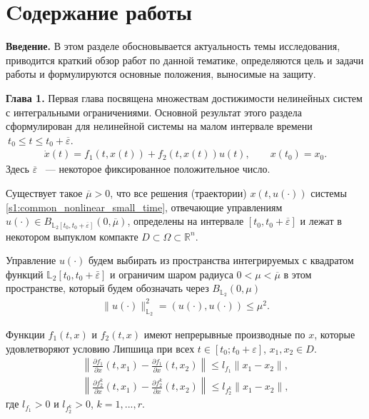 \documentclass[../abstract.tex]{subfiles}
\begin{document}
\section*{Cодержание работы}
\textbf{Введение.} 
В этом разделе обосновывается актуальность темы исследования, приводится краткий обзор работ по данной тематике, определяются цель и задачи работы и формулируются основные положения, выносимые на защиту.


\textbf{Глава 1.}
Первая глава посвящена множествам достижимости нелинейных систем с интегральными ограничениями. 
Основной результат этого раздела сформулирован для нелинейной системы на малом интервале времени $\ t_0 \leqslant t \leqslant t_0 + \overline{\varepsilon} $.
\begin{gather}\label{s1:common_nonlinear_small_time}
	\dot{x}(t)=f_1(t,x(t))+f_2(t,x(t))u(t), \qquad x(t_0) = x_0.
\end{gather}
Здесь $ \overline{\varepsilon} $ ~--- некоторое фиксированное положительное число.

\begin{assumption}\label{s1:as:right_hand_side_conditions_global}
	Существует такое $\overline{\mu} > 0 $, что все решения (траектории) $ x(t, u(\cdot)) $ системы \eqref{s1:common_nonlinear_small_time}, отвечающие управлениям $u(\cdot) \in B_{\mathbb{L}_2[t_0, t_0 + \overline{\varepsilon}]}(0,\overline{\mu})$, определены на интервале $ [t_0,t_0 + \overline{\varepsilon}] $ и лежат в некотором выпуклом компакте $D \subset \Omega \subset \mathbb{R}^n$. 
\end{assumption}

Управление $u(\cdot)$ будем выбирать из пространства интегрируемых с квадратом функций $\mathbb{L}_2[t_0,t_0+\bar{\varepsilon}]$ и ограничим шаром радиуса $ 0 < \mu < \overline{\mu} $ в этом пространстве, который будем обозначать через $B_{\mathbb{L}_2}(0, \mu)$
\begin{gather*}
	\lVert u(\cdot)\rVert^2_{\mathbb{L}_2} = \left(u(\cdot),u(\cdot) \right) \leqslant \mu^2.
\end{gather*}

\begin{assumption}\label{s1:as:right_hand_side_diff_lip}
	Функции $f_1(t,x)$ и $f_2(t,x)$ имеют непрерывные производные по $x$, которые удовлетворяют условию Липшица при всех $t \in [t_0;t_0 + \varepsilon]$, $x_1, x_2 \in D$.
	\begin{gather*}
		\left\| \frac{\partial f_1}{\partial x}(t,x_1) - \frac{\partial f_1}{\partial x}(t,x_2) \right\| \leqslant l_{f_1} \| x_1 - x_2\|, \\
		 \left\| \frac{\partial f_2^k}{\partial x}(t,x_1) - \frac{\partial f_2^k}{\partial x}(t,x_2) \right\| \leqslant l_{f_2^k} \| x_1 - x_2\|,
	\end{gather*}
	где $l_{f_1} > 0$ и $l_{f_2^k} > 0$, $k = 1,...,r$.
\end{assumption}
\end{document}
